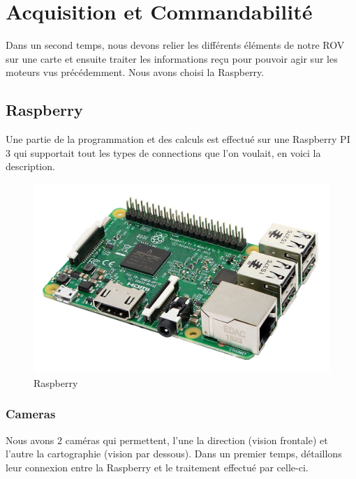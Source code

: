 \documentclass[a4paper,11pt]{report}
\begin{document}
				
\chapter{Acquisition et Commandabilité}
	
	Dans un second temps, nous devons relier les différents éléments de notre ROV sur une carte et ensuite traiter les informations reçu pour pouvoir agir sur les moteurs vus précédemment. Nous avons choisi la Raspberry.
	
	\section{Raspberry}
		Une partie de la programmation et des calculs est effectué sur une Raspberry PI 3 qui supportait tout les types de connections que l'on voulait, en voici la description.
			\begin{figure}[!h]
					\begin{center}
						\includegraphics[scale=0.2]{Photos/Raspberry.jpg}
						\caption{Raspberry}
					\end{center}
				\end{figure}
				
		\subsection{Cameras}
			Nous avons 2 caméras qui permettent, l'une la direction (vision frontale) et l'autre la cartographie (vision par dessous). Dans un premier temps, détaillons leur connexion entre la Raspberry et le traitement effectué par celle-ci.
			
\end{document}
